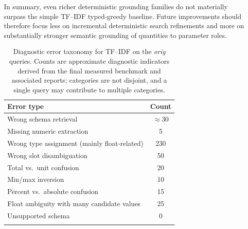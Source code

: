 \documentclass[pdflatex,sn-basic,Numbered]{sn-jnl}
\begin{document}
In summary, even richer deterministic grounding families do not materially surpass the simple TF--IDF typed-greedy baseline. Future improvements should therefore focus less on incremental deterministic search refinements and more on substantially stronger semantic grounding of quantities to parameter roles.

\begin{table}[t]
  \centering
  \caption{Diagnostic error taxonomy for TF--IDF on the \emph{orig} queries. Counts are approximate diagnostic indicators derived from the final measured benchmark and associated reports; categories are not disjoint, and a single query may contribute to multiple categories.}
  \label{tab:nlp4lp-error-taxonomy}
  \small
  \setlength{\tabcolsep}{4pt}
  \begin{tabular}{p{6.2cm}c}
    \toprule
    Error type & Count \\
    \midrule
    Wrong schema retrieval & $\approx 30$ \\
    Missing numeric extraction & 5 \\
    Wrong type assignment (mainly float-related) & 230 \\
    Wrong slot disambiguation & 50 \\
    Total vs.\ unit confusion & 20 \\
    Min/max inversion & 10 \\
    Percent vs.\ absolute confusion & 15 \\
    Float ambiguity with many candidate values & 25 \\
    Unsupported schema & 0 \\
    \botrule
  \end{tabular}
\end{table}
\end{document}
